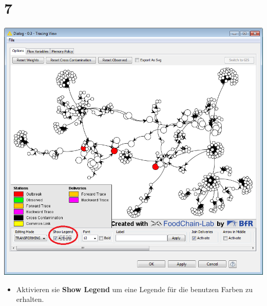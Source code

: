 \documentclass{beamer}
\begin{document}
\section{7}
\begin{frame}
	\begin{center}
  		\includegraphics[height=0.6\textheight]{7.png}
	\end{center}
	\begin{itemize}
		\item Aktivieren sie \textbf{Show Legend} um eine Legende für die benutzen Farben zu erhalten.
	\end{itemize}
\end{frame}
\end{document}
